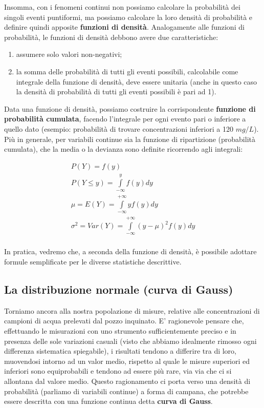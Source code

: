 \documentclass[a4paper,12pt,oneside]{book}
\providecommand{\tightlist}{%
  \setlength{\itemsep}{0pt}\setlength{\parskip}{0pt}}
\begin{document}
Insomma, con i fenomeni continui non possiamo calcolare la probabilità dei singoli eventi puntiformi, ma possiamo calcolare la loro densità di probabilità e definire quindi apposite \textbf{funzioni di densità}. Analogamente alle funzioni di probabilità, le funzioni di densità debbono avere due caratteristiche:

\begin{enumerate}
\def\labelenumi{\arabic{enumi}.}
\tightlist
\item
  assumere solo valori non-negativi;
\item
  la somma delle probabilità di tutti gli eventi possibili, calcolabile come integrale della funzione di densità, deve essere unitaria (anche in questo caso la densità di probabilità di tutti gli eventi possibili è pari ad 1).
\end{enumerate}

Data una funzione di densità, possiamo costruire la corrispondente \textbf{funzione di probabilità cumulata}, facendo l'integrale per ogni evento pari o inferiore a quello dato (esempio: probabilità di trovare concentrazioni inferiori a 120 \(mg/L\)). Più in generale, per variabili continue sia la funzione di ripartizione (probabilità cumulata), che la media o la devianza sono definite ricorrendo agli integrali:

\[ \begin{array}{l}
P(Y) = f(y) \\ 
P(Y \leq y) = \int\limits_{ - \infty }^y {f(y)} dy \\ 
\mu  = E(Y) = \int\limits_{ - \infty }^{ + \infty } {yf(y)} dy \\ 
\sigma^2  = Var(Y) = \int\limits_{ - \infty }^{ + \infty } {\left( {y - \mu } \right)^2 f(y)} dy \\ 
\end{array}\]

In pratica, vedremo che, a seconda della funzione di densità, è possibile adottare formule semplificate per le diverse statistiche descrittive.

\hypertarget{la-distribuzione-normale-curva-di-gauss}{%
\subsection{La distribuzione normale (curva di Gauss)}\label{la-distribuzione-normale-curva-di-gauss}}

Torniamo ancora alla nostra popolazione di misure, relative alle concentrazioni di campioni di acqua prelevati dal pozzo inquinato. E' ragionevole pensare che, effettuando le misurazioni con uno strumento sufficientemente preciso e in presenza delle sole variazioni casuali (visto che abbiamo idealmente rimosso ogni differenza sistematica spiegabile), i risultati tendono a differire tra di loro, muovendosi intorno ad un valor medio, rispetto al quale le misure superiori ed inferiori sono equiprobabili e tendono ad essere più rare, via via che ci si allontana dal valore medio. Questo ragionamento ci porta verso una densità di probabilità (parliamo di variabili continue) a forma di campana, che potrebbe essere descritta con una funzione continua detta \textbf{curva di Gauss}.
\end{document}
